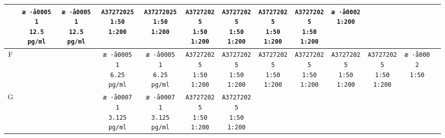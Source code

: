 \documentclass[UTF8,10pt,a4paper,fontset=fandol]{ctexart}
\begin{document}
\begin{center}
{\begin{tabular}{c|c|c|c|c|c|c|c|c|c|c|c|c}
  & \texttt{æ ·å0005\\1\\12.5 pg/ml}
  & \texttt{æ ·å0005\\1\\12.5 pg/ml}
  & \texttt{A37272025\\1:50\\1:200}
  & \texttt{A37272025\\1:50\\1:200}
  & \texttt{A37272025\\1:50\\1:200}
  & \texttt{A37272025\\1:50\\1:200}
  & \texttt{A37272025\\1:50\\1:200}
  & \texttt{A37272025\\1:50\\1:200}
  & \texttt{æ ·å0002\\1:200}
  & \\
\hline
F & &
  & \texttt{æ ·å0005\\1\\6.25 pg/ml}
  & \texttt{æ ·å0005\\1\\6.25 pg/ml}
  & \texttt{A37272025\\1:50\\1:200}
  & \texttt{A37272025\\1:50\\1:200}
  & \texttt{A37272025\\1:50\\1:200}
  & \texttt{A37272025\\1:50\\1:200}
  & \texttt{A37272025\\1:50\\1:200}
  & \texttt{A37272025\\1:50\\1:200}
  & \texttt{æ ·å0002\\1:50}
  & \\
\hline
G & &
  & \texttt{æ ·å0007\\1\\3.125 pg/ml}
  & \texttt{æ ·å0007\\1\\3.125 pg/ml}
  & \texttt{A37272025\\1:50\\1:200}
  & \texttt{A37272025\\1:50\\1:200}

\end{tabular}}
\end{center}
\end{document}
